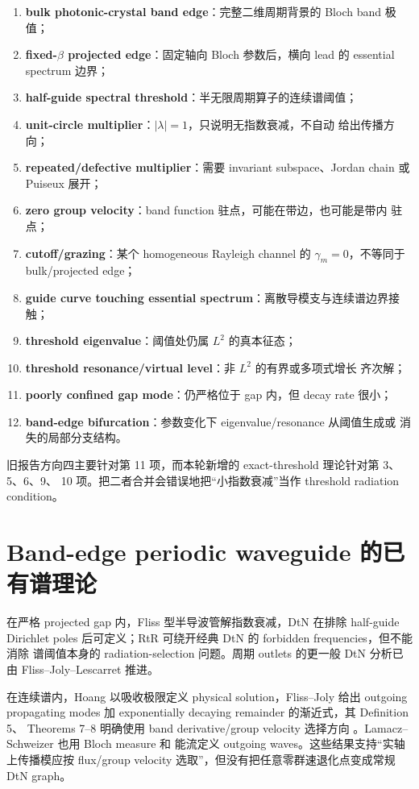 \documentclass[UTF8,11pt,fontset=none]{ctexart}
\begin{document}
\begin{enumerate}
  \item \textbf{bulk photonic-crystal band edge}：完整二维周期背景的 Bloch band 极值；
  \item \textbf{fixed-\(\beta\) projected edge}：固定轴向 Bloch 参数后，横向 lead 的
    essential spectrum 边界；
  \item \textbf{half-guide spectral threshold}：半无限周期算子的连续谱阈值；
  \item \textbf{unit-circle multiplier}：\(|\lambda|=1\)，只说明无指数衰减，不自动
    给出传播方向；
  \item \textbf{repeated/defective multiplier}：需要 invariant subspace、Jordan chain
    或 Puiseux 展开；
  \item \textbf{zero group velocity}：band function 驻点，可能在带边，也可能是带内
    驻点；
  \item \textbf{cutoff/grazing}：某个 homogeneous Rayleigh channel 的
    \(\gamma_m=0\)，不等同于 bulk/projected edge；
  \item \textbf{guide curve touching essential spectrum}：离散导模支与连续谱边界接触；
  \item \textbf{threshold eigenvalue}：阈值处仍属 \(L^2\) 的真本征态；
  \item \textbf{threshold resonance/virtual level}：非 \(L^2\) 的有界或多项式增长
    齐次解；
  \item \textbf{poorly confined gap mode}：仍严格位于 gap 内，但 decay rate 很小；
  \item \textbf{band-edge bifurcation}：参数变化下 eigenvalue/resonance 从阈值生成或
    消失的局部分支结构。
\end{enumerate}

旧报告方向四主要针对第 11 项，而本轮新增的 exact-threshold 理论针对第 3、5、6、9、
10 项。把二者合并会错误地把“小指数衰减”当作 threshold radiation condition。

\section{Band-edge periodic waveguide 的已有谱理论}

在严格 projected gap 内，Fliss 型半导波管解指数衰减，DtN 在排除 half-guide
Dirichlet poles 后可定义；RtR 可绕开经典 DtN 的 forbidden frequencies，但不能消除
谱阈值本身的 radiation-selection 问题。周期 outlets 的更一般 DtN 分析已由
Fliss--Joly--Lescarret 推进\cite{FlissJolyLescarret2021}。

在连续谱内，Hoang 以吸收极限定义 physical solution，Fliss--Joly 给出 outgoing
propagating modes 加 exponentially decaying remainder 的渐近式，其 Definition 5、
Theorems 7--8 明确使用 band derivative/group velocity 选择方向
\cite{Hoang2011LAP,FlissJoly2016Radiation}。Lamacz--Schweizer 也用 Bloch measure 和
能流定义 outgoing waves\cite{LamaczSchweizer2018}。这些结果支持“实轴上传播模应按
flux/group velocity 选取”，但没有把任意零群速退化点变成常规 DtN graph。
\end{document}
